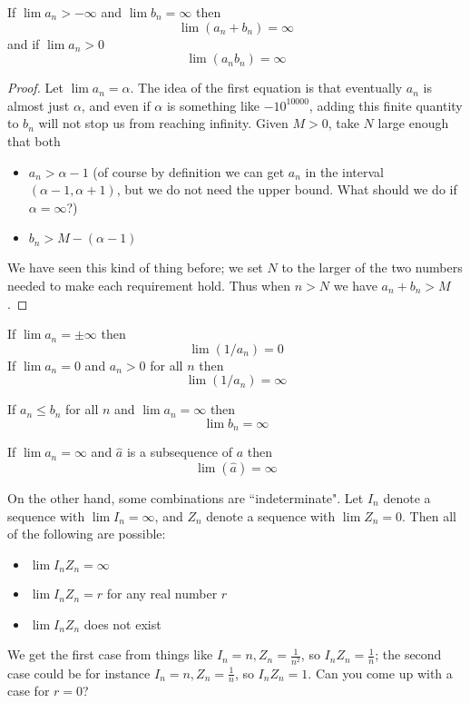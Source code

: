 \begin{thm}\label{thm:prodOfInfLim}
If $\lim a_n > -\infty$ and $\lim b_n = \infty$ then
\[
\lim (a_n+b_n) = \infty
\]  
and if $\lim a_n > 0$
\[
\lim (a_nb_n) = \infty
\]  
\end{thm}
\begin{proof}
Let $\lim a_n=\alpha$. The idea of the first equation is that eventually $a_n$ is almost just $\alpha$, and even if $\alpha$ is something like $-10^{10000}$, adding this finite quantity to $b_n$ will not stop us from reaching infinity. Given $M>0$, take $N$ large enough that both
\begin{itemize}
\item $a_n > \alpha-1$ (of course by definition we can get $a_n$ in the interval $(\alpha-1, \alpha+1)$, but we do not need the upper bound. What should we do if $\alpha=\infty$?)
\item $b_n > M - (\alpha-1)$
\end{itemize}
We have seen this kind of thing before; we set $N$ to the larger of the two numbers needed to make each requirement hold. Thus when $n>N$ we have $a_n+b_n > M$.
\end{proof}


\begin{thm}\label{thm:invOfInfLim}
If $\lim a_n = \pm\infty$ then
\[
\lim (1/a_n) = 0
\]
If $\lim a_n = 0$ and $a_n > 0$ for all $n$ then
\[
\lim (1/a_n) = \infty
\]
\end{thm}


\begin{thm}\label{thm:ineqInfLim}
If $a_n \leq b_n$ for all $n$ and $\lim a_n = \infty$ then
\[
\lim b_n = \infty
\]  
\end{thm}

\begin{thm}\label{thm:subsequenceInfLim}
If $\lim a_n = \infty$ and $\hat a$ is a subsequence of $a$ then
\[
\lim (\hat a) = \infty
\]
\end{thm}

On the other hand, some combinations are ``indeterminate". Let $I_n$ denote a sequence with $\lim I_n = \infty$, and $Z_n$ denote a sequence with $\lim Z_n = 0$. Then all of the following are possible:
\begin{itemize}
\item $\lim I_nZ_n = \infty$
\item $\lim I_nZ_n = r$ for any real number $r$
\item $\lim I_nZ_n$ does not exist
\end{itemize}
We get the first case from things like $I_n=n, Z_n = \frac{1}{n^2}$, so $I_nZ_n = \frac{1}{n}$; the second case could be for instance $I_n=n, Z_n = \frac{1}{n}$, so $I_nZ_n = 1$. Can you come up with a case for $r=0$?

